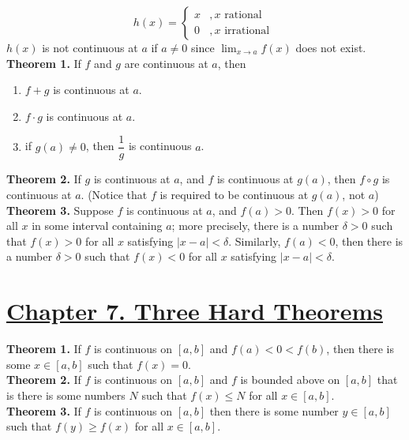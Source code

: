 \documentclass[10pt,letterpaper]{article}
\begin{document}
	$$h(x) = 
	\begin{cases}
	x &, x \text{ rational } \\
	0 &, x \text{ irrational }
	\end{cases}$$
	$h(x)$ is not continuous at $a$ if $a \neq 0$ since $\displaystyle\lim_{x\to a}f(x)$ does not exist. \\
	

	\textbf{Theorem 1. } If $f$ and $g$ are continuous at $a$, then
	\begin{enumerate}[(1)]
		\item $f + g$ is continuous at $a$.
		\item $f \cdot g$ is continuous at $a$.
		\item if $g(a) \neq 0$, then $\dfrac{1}{g}$ is continuous $a$.
	\end{enumerate}
	
	\textbf{Theorem 2. } If $g$ is continuous at $a$, and $f$ is continuous at $g(a)$,
	then $f \circ g$ is continuous at $a$. (Notice that $f$ is required to be continuous 
	at $g(a)$, not $a$) \\
	
	\textbf{Theorem 3. } Suppose $f$ is continuous at $a$, and $f(a) > 0$. Then $f(x) > 0$
	for all $x$ in some interval containing $a$; more precisely, there is a number $\delta > 0$
	such that $f(x) > 0$ for all $x$ satisfying $|x - a| < \delta$. Similarly, $f(a) < 0$, then
	there is a number $\delta > 0$ such that $f(x) < 0$ for all $x$ satisfying $|x - a| < \delta$. \\
	
	
	\section*{{\color{red}\underline{Chapter 7. Three Hard Theorems}}}	
	
	\textbf{Theorem 1.} If $f$ is continuous on $[a, b]$ and $f(a) < 0 < f(b)$, then there is some $x \in [a, b]$
	such that $f(x) = 0$. \\
	
	\textbf{Theorem 2.} If $f$ is continuous on $[a, b]$ and $f$ is bounded above on $[a, b]$ that is
	there is some numbers $N$ such that $f(x) \leq N$ for all $x \in [a, b]$. \\
	
	\textbf{Theorem 3.} If $f$ is continuous on $[a, b]$ then there is some number $y \in [a, b]$ such that
	$f(y) \geq f(x)$ for all $x \in [a, b]$.\\
	
\end{document}
